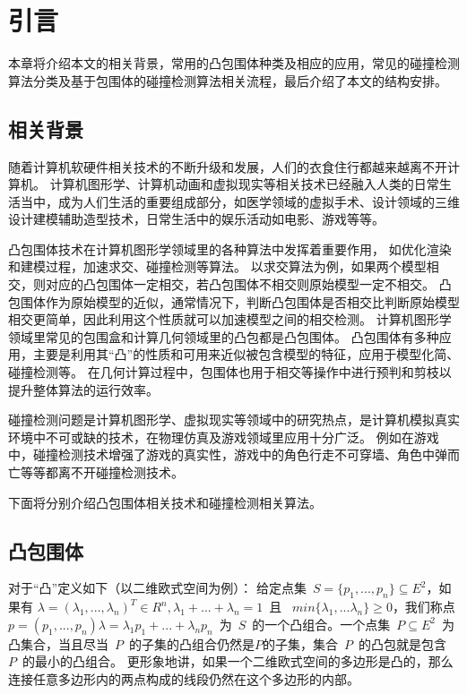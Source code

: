 

\chapter{引言}
\label{cha:intro}

本章将介绍本文的相关背景，常用的凸包围体种类及相应的应用，常见的碰撞检测算法分类及基于包围体的碰撞检测算法相关流程，最后介绍了本文的结构安排。


\section{相关背景}

随着计算机软硬件相关技术的不断升级和发展，人们的衣食住行都越来越离不开计算机。
计算机图形学、计算机动画和虚拟现实等相关技术已经融入人类的日常生活当中，成为人们生活的重要组成部分，如医学领域的虚拟手术、设计领域的三维设计建模辅助造型技术，日常生活中的娱乐活动如电影、游戏等等。

凸包围体技术在计算机图形学领域里的各种算法中发挥着重要作用，
如优化渲染和建模过程，加速求交、碰撞检测等算法。
以求交算法为例，如果两个模型相交，则对应的凸包围体一定相交，若凸包围体不相交则原始模型一定不相交。
凸包围体作为原始模型的近似，通常情况下，判断凸包围体是否相交比判断原始模型相交更简单，因此利用这个性质就可以加速模型之间的相交检测。
计算机图形学领域里常见的包围盒和计算几何领域里的凸包都是凸包围体。
凸包围体有多种应用，主要是利用其“凸”的性质和可用来近似被包含模型的特征，应用于模型化简、碰撞检测等。
在几何计算过程中，包围体也用于相交等操作中进行预判和剪枝以提升整体算法的运行效率。

碰撞检测问题是计算机图形学、虚拟现实等领域中的研究热点，是计算机模拟真实环境中不可或缺的技术，在物理仿真及游戏领域里应用十分广泛。
例如在游戏中，碰撞检测技术增强了游戏的真实性，游戏中的角色行走不可穿墙、角色中弹而亡等等都离不开碰撞检测技术。

下面将分别介绍凸包围体相关技术和碰撞检测相关算法。

\section{凸包围体}
\label{sec:convex-bv}

对于“凸”定义\cite{Preparata1985Introduction}如下（以二维欧式空间为例）：
给定点集~$S = \{p_1, ..., p_n\} \subseteq E^2$，如果有
$\lambda = (\lambda_1,...,\lambda_n)^T \in R^n, \lambda_1 + ... + \lambda_n = 1
$~且~ $min\{\lambda_1,...\lambda_n\} \geq 0$，我们称点 $p = (p_1, ... ,
p_n)\lambda = \lambda_1 p_1 + ... + \lambda_n
p_n$~为~$S$~的一个凸组合。一个点集~$P \subseteq E^2$~为凸集合，当且尽当~$P$~的子集的凸组合仍然是$P$的子集，集合~$P$~的凸包就是包含~$P$~的最小的凸组合。
更形象地讲，如果一个二维欧式空间的多边形是凸的，那么连接任意多边形内的两点构成的线段仍然在这个多边形的内部。

